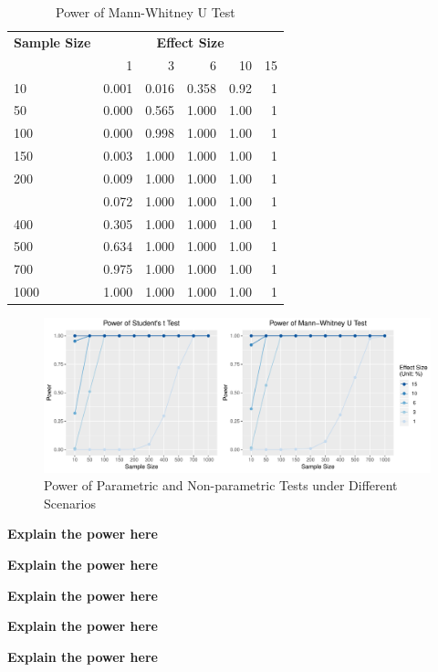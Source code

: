 \documentclass[]{article}
\begin{document}
\begin{longtable}[t]{lrrrrr}
\caption{\label{tab:power-tables}Power of Mann-Whitney U Test}\\
\toprule
\multicolumn{1}{c}{\bfseries Sample Size} & \multicolumn{5}{c}{\bfseries Effect Size} \\
\cmidrule(l{2pt}r{2pt}){1-1} \cmidrule(l{2pt}r{2pt}){2-6}
  & 1 & 3 & 6 & 10 & 15\\
\midrule
10 & 0.001 & 0.016 & 0.358 & 0.92 & 1\\
50 & 0.000 & 0.565 & 1.000 & 1.00 & 1\\
100 & 0.000 & 0.998 & 1.000 & 1.00 & 1\\
150 & 0.003 & 1.000 & 1.000 & 1.00 & 1\\
200 & 0.009 & 1.000 & 1.000 & 1.00 & 1\\
\addlinespace
300 & 0.072 & 1.000 & 1.000 & 1.00 & 1\\
400 & 0.305 & 1.000 & 1.000 & 1.00 & 1\\
500 & 0.634 & 1.000 & 1.000 & 1.00 & 1\\
700 & 0.975 & 1.000 & 1.000 & 1.00 & 1\\
1000 & 1.000 & 1.000 & 1.000 & 1.00 & 1\\
\bottomrule
\end{longtable}

\begin{figure}
\centering
\includegraphics{../figure/power.pdf}
\caption{Power of Parametric and Non-parametric Tests under Different
Scenarios}
\end{figure}

\textbf{Explain the power here}

\textbf{Explain the power here}

\textbf{Explain the power here}

\textbf{Explain the power here}

\textbf{Explain the power here}
\end{document}
